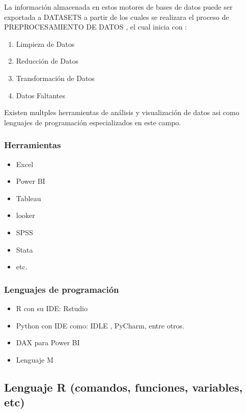 \documentclass[
  letterpaper,
  DIV=11,
  numbers=noendperiod]{scrartcl}
\begin{document}
La información almacenada en estos motores de bases de datos puede ser
exportada a DATASETS a partir de los cuales se realizara el proceso de
PREPROCESAMIENTO DE DATOS , el cual inicia con :

\begin{enumerate}
\def\labelenumi{\arabic{enumi}.}
\item
  Limpieza de Datos
\item
  Reducción de Datos
\item
  Transformación de Datos
\item
  Datos Faltantes
\end{enumerate}

Existen multples herramientas de análisis y visualización de datos asi
como lenguajes de programación especializados en este campo.

\subsubsection{Herramientas}\label{herramientas}

\begin{itemize}
\item
  Excel
\item
  Power BI
\item
  Tableau
\item
  looker
\item
  SPSS
\item
  Stata
\item
  etc.
\end{itemize}

\subsubsection{Lenguajes de
programación}\label{lenguajes-de-programaciuxf3n}

\begin{itemize}
\item
  R con su IDE: Rstudio
\item
  Python con IDE como: IDLE , PyCharm, entre otros.
\item
  DAX para Power BI
\item
  Lenguaje M
\end{itemize}

\subsection{Lenguaje R (comandos, funciones, variables,
etc)}\label{lenguaje-r-comandos-funciones-variables-etc}
\end{document}

